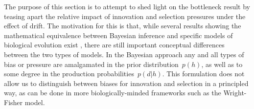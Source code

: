 The purpose of this section is to attempt to shed light on the bottleneck result by teasing apart the relative impact of innovation and selection pressures under the effect of drift. The motivation for this is that, while several results showing the mathematical equivalence between Bayesian inference and specific models of biological evolution exist \citep{Reali2010,Harper2009}, there are still important conceptual differences between the two types of models. In the Bayesian approach any and all types of bias or pressure are amalgamated in the prior distribution~$p(h)$, as well as to some degree in the production probabilities~$p(d|h)$. This formulation does not allow us to distinguish between biases for innovation and selection in a principled way, as can be done in more biologically-minded frameworks such as the Wright-Fisher model.

